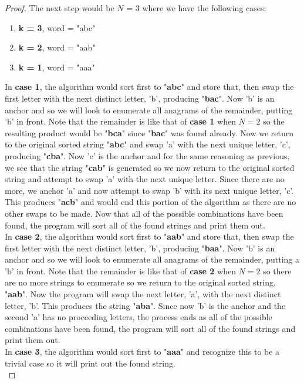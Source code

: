 \documentclass[12pt]{article}
\begin{document}
\begin{proof}
The next step would be $N$ = 3 where we have the following cases:
\begin{enumerate}
  \item \textbf{k = 3}, word = "abc"
  \item \textbf{k = 2}, word = "aab"
  \item \textbf{k = 1}, word = "aaa"
\end{enumerate}
In \textbf{case 1}, the algorithm would sort first to "\textbf{abc}" and store that, then swap the first
letter with the next distinct letter, 'b', producing "\textbf{bac}". Now 'b' is an anchor and so we will look to
enumerate all anagrams of the remainder, putting 'b' in front. Note that the remainder is like that of
\textbf{case 1} when $N=2$ so the resulting product would be "\textbf{bca}" since "\textbf{bac}" was found already.
Now we return to  the original sorted string "\textbf{abc}" and swap 'a' with the next unique letter, 'c', producing
"\textbf{cba}". Now 'c' is the anchor and for the same reasoning as previous, we see that the string "\textbf{cab}"
is generated so we now return to the original sorted string and attempt to swap 'a' with the next unique letter.
Since there are no more, we anchor 'a' and now attempt to swap 'b' with its next unique letter, 'c'. This produces
"\textbf{acb}" and would end this portion of the algorithm as there are no other swaps to be made. Now that all of
the possible combinations have been found, the program will sort all of the found strings and print them out. \\
    \indent In \textbf{case 2}, the algorithm would sort first to "\textbf{aab}" and store that, then swap the first
letter with the next distinct letter, 'b', producing "\textbf{baa}". Now 'b' is an anchor and so we will look to
enumerate all anagrams of the remainder, putting a 'b' in front. Note that the remainder is like that of
\textbf{case 2} when $N=2$ so there are no more strings to enumerate so we return to the original sorted string,
"\textbf{aab}". Now the program will swap the next letter, 'a', with the next distinct letter, 'b'.  This produces
the string "\textbf{aba}".  Since now 'b' is the anchor and the second 'a' has no proceeding letters, the process
ends as all of the possible combinations have been found, the program will sort all of the found strings and
print them out. \\
    \indent In \textbf{case 3}, the algorithm would sort first to "\textbf{aaa}" and recognize this to be a trivial
case so it will print out the found string.  \\


\end{proof}
\end{document}
